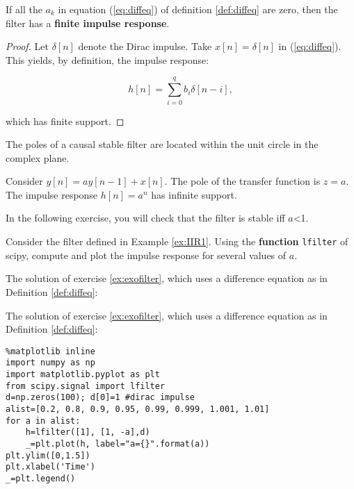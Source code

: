 \begin{property} If all the \(a_k\) in equation
(\ref{eq:diffeq}) of definition \ref{def:diffeq} are zero, then the
filter has a \textbf{finite impulse response}. \end{property}

\begin{proof} Let \(\delta[n]\) denote the Dirac impulse. Take
\(x[n]=\delta[n]\) in (\ref{eq:diffeq}). This yields, by definition, the
impulse response:

\begin{equation}
\label{eq:fir}
h[n]= \sum_{i=0}^q b_i \delta[n-i],
\end{equation}

which has finite support. \end{proof}

\begin{theorem} The poles of a causal stable filter are located
within the unit circle in the complex plane. \end{theorem}

\begin{example} \label{ex:IIR1} Consider
\(y[n]= a y[n-1] + x[n]\). The pole of the transfer function is \(z=a\).
The impulse response \(h[n]=a^n\) has infinite support.
\end{example}

In the following exercise, you will check that the filter is stable iff
\(a\)\textless{}1.

\begin{exercise}\label{ex:exofilter} Consider the filter
defined in Example \ref{ex:IIR1}. Using the \textbf{function}
\texttt{lfilter} of scipy, compute and plot the impulse response for
several values of \(a\). \end{exercise}

    \begin{listing}
The solution of exercise \ref{ex:exofilter}, which uses a difference equation as in Definition \ref{def:diffeq}:
\end{listing}

The solution of exercise \ref{ex:exofilter}, which uses a difference
equation as in Definition \ref{def:diffeq}:
\begin{lstlisting}
%matplotlib inline
import numpy as np
import matplotlib.pyplot as plt 
from scipy.signal import lfilter
d=np.zeros(100); d[0]=1 #dirac impulse
alist=[0.2, 0.8, 0.9, 0.95, 0.99, 0.999, 1.001, 1.01]
for a in alist:
    h=lfilter([1], [1, -a],d)
    _=plt.plot(h, label="a={}".format(a))
plt.ylim([0,1.5])
plt.xlabel('Time')
_=plt.legend()
\end{lstlisting}%
%
    \begin{center}
    \end{center}
    
